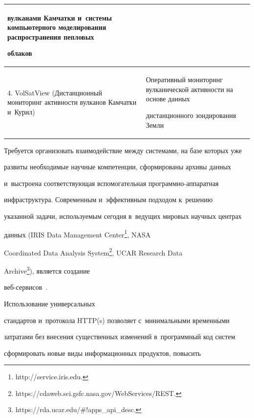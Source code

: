 \begin{table}
\begin{center}
\begin{tabular}{|p{40mm}|p{82mm}|}
вулканами Камчатки и~системы компьютерного моделирования распространения пепловых 


облаков\\


\hline


4. VolSatView (Дистанционный мониторинг активности вулканов Камчатки и~Курил)~\cite{7-


kor} &Оперативный мониторинг вулканической активности на основе данных 


дистанционного зондирования Земли\\


\hline


\end{tabular}


\end{center}




\end{table} 


Требуется организовать взаимодействие между системами, на базе которых уже 


развиты необходимые научные компетенции, сформированы архивы данных 


и~вы\-стро\-ена соответствующая вспомогательная про\-грам\-мно-ап\-па\-рат\-ная 


инфраструктура. Современным и~эффективным подходом к~решению 


указанной задачи, используемым сегодня в~ведущих мировых научных центрах 


данных (IRIS Data Management Center\footnote{{\sf http://service.iris.edu.}}, NASA 


Coordinated Data Analysis System\footnote{{\sf 


https://cdaweb.sci.gsfc.nasa.gov/WebServices/REST.}}, UCAR Research Data 


Archive\footnote{{\sf https://rda.ucar.edu/\#!apps\_api\_desc.}}), является создание  


веб-сер\-ви\-сов~\cite{8-kor, 9-kor, 10-kor}. 





Использование универсальных 


стандартов и~протокола HTTP(s) позволяет с~минимальными временн$\acute{\mbox{ы}}$ми 


затратами без внесения существенных изменений в~программный код систем 


сформировать новые виды информационных продуктов, повысить 


